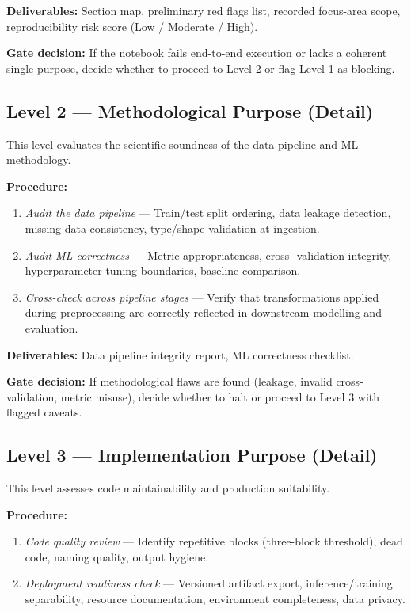 \documentclass[11pt, a4paper]{article}
\begin{document}
\textbf{Deliverables:} Section map, preliminary red flags list, recorded
focus-area scope, reproducibility risk score (Low / Moderate / High).

\textbf{Gate decision:} If the notebook fails end-to-end execution or lacks a
coherent single purpose, decide whether to proceed to Level 2 or flag Level 1
as blocking.

\subsection*{Level 2 — Methodological Purpose (Detail)}

This level evaluates the scientific soundness of the data pipeline and ML
methodology.

\textbf{Procedure:}
\begin{enumerate}
  \item \textit{Audit the data pipeline} — Train/test split ordering,
    data leakage detection, missing-data consistency, type/shape validation at
    ingestion.
  \item \textit{Audit ML correctness} — Metric appropriateness, cross-
    validation integrity, hyperparameter tuning boundaries, baseline
    comparison.
  \item \textit{Cross-check across pipeline stages} — Verify that
    transformations applied during preprocessing are correctly reflected in
    downstream modelling and evaluation.
\end{enumerate}

\textbf{Deliverables:} Data pipeline integrity report, ML correctness
checklist.

\textbf{Gate decision:} If methodological flaws are found (leakage, invalid
cross-validation, metric misuse), decide whether to halt or proceed to Level
3 with flagged caveats.

\subsection*{Level 3 — Implementation Purpose (Detail)}

This level assesses code maintainability and production suitability.

\textbf{Procedure:}
\begin{enumerate}
  \item \textit{Code quality review} — Identify repetitive blocks (three-block
    threshold), dead code, naming quality, output hygiene.
  \item \textit{Deployment readiness check} — Versioned artifact export,
    inference/training separability, resource documentation, environment
    completeness, data privacy.
\end{enumerate}
\end{document}
